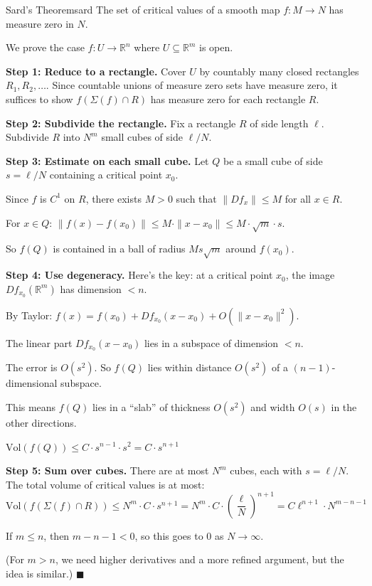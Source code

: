 \documentclass[11pt, letterpaper, openany]{book}
\renewenvironment{proof}[1][\proofname]{%
  \tcolorbox[blanker, breakable, left=1em,
    before skip=1em, after skip=1em,
    borderline west={2pt}{0pt}{MagicTeal!50},
    colback=MagicCream,
    before upper={\textcolor{MagicTeal}{\sffamily\bfseries #1.}\space}
  ]%
}{%
  \hfill\textcolor{MagicTeal}{\ensuremath{\blacksquare}}\endtcolorbox%
}
\begin{document}
\begin{thm}{Sard's Theorem}{sard}
The set of critical values of a smooth map $f: M \to N$ has measure zero in $N$.
\end{thm}

\begin{proof}
We prove the case $f: U \to \mathbb{R}^n$ where $U \subseteq \mathbb{R}^m$ is open.

\textbf{Step 1: Reduce to a rectangle.}
Cover $U$ by countably many closed rectangles $R_1, R_2, \ldots$. Since countable unions of measure zero sets have measure zero, it suffices to show $f(\Sigma(f) \cap R)$ has measure zero for each rectangle $R$.

\textbf{Step 2: Subdivide the rectangle.}
Fix a rectangle $R$ of side length $\ell$. Subdivide $R$ into $N^m$ small cubes of side $\ell/N$.

\textbf{Step 3: Estimate on each small cube.}
Let $Q$ be a small cube of side $s = \ell/N$ containing a critical point $x_0$.

Since $f$ is $C^1$ on $R$, there exists $M > 0$ such that $\|Df_x\| \leq M$ for all $x \in R$.

For $x \in Q$: $\|f(x) - f(x_0)\| \leq M \cdot \|x - x_0\| \leq M \cdot \sqrt{m} \cdot s$.

So $f(Q)$ is contained in a ball of radius $Ms\sqrt{m}$ around $f(x_0)$.

\textbf{Step 4: Use degeneracy.}
Here's the key: at a critical point $x_0$, the image $Df_{x_0}(\mathbb{R}^m)$ has dimension $< n$.

By Taylor: $f(x) = f(x_0) + Df_{x_0}(x - x_0) + O(\|x - x_0\|^2)$.

The linear part $Df_{x_0}(x - x_0)$ lies in a subspace of dimension $< n$.

The error is $O(s^2)$. So $f(Q)$ lies within distance $O(s^2)$ of a $(n-1)$-dimensional subspace.

This means $f(Q)$ lies in a ``slab'' of thickness $O(s^2)$ and width $O(s)$ in the other directions.

$\text{Vol}(f(Q)) \leq C \cdot s^{n-1} \cdot s^2 = C \cdot s^{n+1}$

\textbf{Step 5: Sum over cubes.}
There are at most $N^m$ cubes, each with $s = \ell/N$. The total volume of critical values is at most:
\[\text{Vol}(f(\Sigma(f) \cap R)) \leq N^m \cdot C \cdot s^{n+1} = N^m \cdot C \cdot \left(\frac{\ell}{N}\right)^{n+1} = C\ell^{n+1} \cdot N^{m-n-1}\]

If $m \leq n$, then $m - n - 1 < 0$, so this goes to 0 as $N \to \infty$.

(For $m > n$, we need higher derivatives and a more refined argument, but the idea is similar.)
\end{proof}
\end{document}
